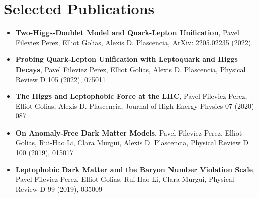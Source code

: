 \documentclass[a4paper,20pt]{article}
\newcommand{\publication}[2]{
  \item\small{
    \textbf{#1}{, #2 \vspace{-2pt}}
  }
}
\newcommand{\publicationSubItem}[2]{\publication{#1}{#2}\vspace{-3pt}}
\newcommand{\resumeSubHeadingListStart}{\begin{itemize}[leftmargin=*]}
\newcommand{\resumeSubHeadingListEnd}{\end{itemize}}
\begin{document}
\section{Selected Publications}
\resumeSubHeadingListStart
\publicationSubItem{Two-Higgs-Doublet Model and Quark-Lepton Unification}{Pavel Fileviez Perez, Elliot Golias, Alexis D. Plascencia, ArXiv: 2205.02235 (2022).}{Preprint soon to be published}
\vspace{2pt}
\publicationSubItem{Probing Quark-Lepton Unification with Leptoquark and Higgs Decays}{Pavel Fileviez Perez, Elliot Golias, Alexis D. Plascencia, Physical Review D 105 (2022), 075011}
\vspace{2pt}
\publicationSubItem{The Higgs and Leptophobic Force at the LHC}{Pavel Fileviez Perez, Elliot Golias, Alexis D. Plascencia, Journal of High Energy Physics 07 (2020) 087}
\vspace{2pt}
\publicationSubItem{On Anomaly-Free Dark Matter Models}{Pavel Fileviez Perez, Elliot Golias, Rui-Hao Li, Clara Murgui, Alexis D. Plascencia, Physical Review D 100 (2019), 015017}
\vspace{2pt}
\publicationSubItem{Leptophobic Dark Matter and the Baryon Number Violation Scale}{Pavel Fileviez Perez, Elliot Golias, Rui-Hao Li, Clara Murgui, Physical Review D 99 (2019), 035009}
\resumeSubHeadingListEnd
\vspace{-5pt}
\end{document}
